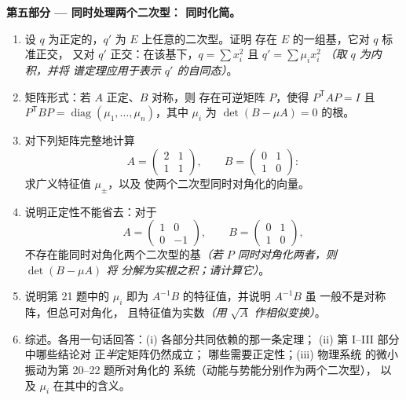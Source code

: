 \begin{problem}
\medskip
\noindent\textbf{第五部分 --- 同时处理两个二次型：
同时化简。}
\begin{enumerate}[resume]
  \item 设 $q$ 为正定的，$q'$ 为
        $E$ 上任意的二次型。证明
        存在 $E$ 的一组基，它对 $q$ 标准正交，
        又对 $q'$ 正交：在该基下，$q = \sum x_i^2$ 且 $q' = \sum \mu_i
        x_i^2$ \emph{（取 $q$ 为内积，并将
        谱定理应用于表示
        $q'$ 的自同态）}。
  \item 矩阵形式：若 $A$ 正定、$B$ 对称，则
        存在可逆矩阵 $P$，使得
        $P^{\mathsf T}AP = I$ 且 $P^{\mathsf T}BP =
        \operatorname{diag}(\mu_1, \dots, \mu_n)$，其中
        $\mu_i$ 为 $\det(B - \mu A) = 0$ 的根。
  \item 对下列矩阵完整地计算
        \[
        A = \begin{pmatrix} 2 & 1\\ 1 & 1 \end{pmatrix},
        \qquad
        B = \begin{pmatrix} 0 & 1\\ 1 & 0 \end{pmatrix} :
        \]
        求广义特征值 $\mu_\pm$，以及
        使两个二次型同时对角化的向量。
  \item 说明正定性不能省去：对于
        \[
        A = \begin{pmatrix} 1 & 0\\ 0 & -1 \end{pmatrix},
        \qquad
        B = \begin{pmatrix} 0 & 1\\ 1 & 0 \end{pmatrix},
        \]
        不存在能同时对角化两个二次型的基\emph{（若 $P$
        同时对角化两者，则 $\det(B - \mu A)$ 将
        分解为实根之积；请计算它）}。
  \item 说明第 21 题中的 $\mu_i$ 即为
        $A^{-1}B$ 的特征值，并说明 $A^{-1}B$ 虽
        一般不是对称阵，但总可对角化，
        且特征值为实数\emph{（用 $\sqrt A$ 作相似变换）}。
  \item 综述。各用一句话回答：(i) 各部分共同依赖的那一条定理；
        (ii) 第 I--III 部分中哪些结论对
        正\emph{半}定矩阵仍然成立；
        哪些需要正定性；(iii) 物理系统
        的微小振动为第 20--22 题所对角化的
        系统（动能与势能分别作为两个二次型），
        以及 $\mu_i$ 在其中的含义。
\end{enumerate}
\end{problem}
